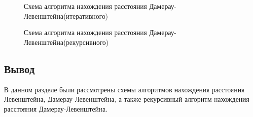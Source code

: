 \documentclass[a4paper, 14pt]{article}
\begin{document}
\begin{center}
\begin{figure}[h]
			\caption{Схема алгоритма нахождения расстояния Дамерау-Левенштейна(итеративного)}
			\label{ris:image}
		\end{figure}
		\newpage
        \begin{figure}[h]
			\caption{Схема алгоритма нахождения расстояния Дамерау-Левенштейна(рекурсивного)}
			\label{ris:image}
		\end{figure}
		\newpage
    \end{center}
    
    
    
\subsection{Вывод}
 	
    \begin{flushleft}	
	В данном разделе были рассмотрены схемы алгоритмов нахождения расстояния Левенштейна, Дамерау-Левенштейна, а также рекурсивный алгоритм нахождения расстояния Дамерау-Левенштейна.
    \end{flushleft}
\end{document}
